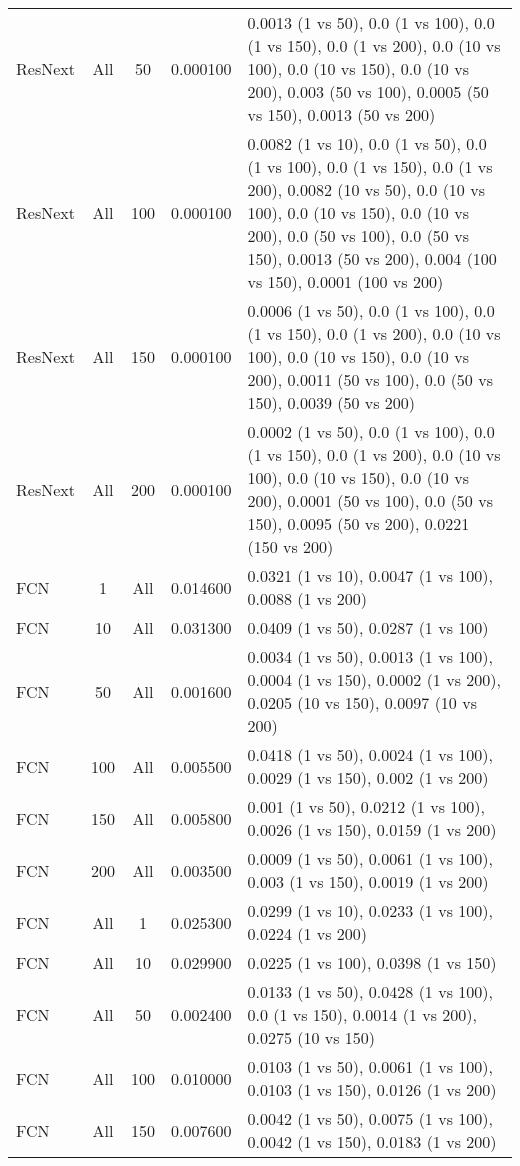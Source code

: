 \begin{tabular}{|l|c|c|c|p{7cm}|}
ResNext & All & 50 & 0.000100 & 0.0013 (1 vs 50), 0.0 (1 vs 100), 0.0 (1 vs 150), 0.0 (1 vs 200), 0.0 (10 vs 100), 0.0 (10 vs 150), 0.0 (10 vs 200), 0.003 (50 vs 100), 0.0005 (50 vs 150), 0.0013 (50 vs 200) \\
ResNext & All & 100 & 0.000100 & 0.0082 (1 vs 10), 0.0 (1 vs 50), 0.0 (1 vs 100), 0.0 (1 vs 150), 0.0 (1 vs 200), 0.0082 (10 vs 50), 0.0 (10 vs 100), 0.0 (10 vs 150), 0.0 (10 vs 200), 0.0 (50 vs 100), 0.0 (50 vs 150), 0.0013 (50 vs 200), 0.004 (100 vs 150), 0.0001 (100 vs 200) \\
ResNext & All & 150 & 0.000100 & 0.0006 (1 vs 50), 0.0 (1 vs 100), 0.0 (1 vs 150), 0.0 (1 vs 200), 0.0 (10 vs 100), 0.0 (10 vs 150), 0.0 (10 vs 200), 0.0011 (50 vs 100), 0.0 (50 vs 150), 0.0039 (50 vs 200) \\
ResNext & All & 200 & 0.000100 & 0.0002 (1 vs 50), 0.0 (1 vs 100), 0.0 (1 vs 150), 0.0 (1 vs 200), 0.0 (10 vs 100), 0.0 (10 vs 150), 0.0 (10 vs 200), 0.0001 (50 vs 100), 0.0 (50 vs 150), 0.0095 (50 vs 200), 0.0221 (150 vs 200) \\
FCN & 1 & All & 0.014600 & 0.0321 (1 vs 10), 0.0047 (1 vs 100), 0.0088 (1 vs 200) \\
FCN & 10 & All & 0.031300 & 0.0409 (1 vs 50), 0.0287 (1 vs 100) \\
FCN & 50 & All & 0.001600 & 0.0034 (1 vs 50), 0.0013 (1 vs 100), 0.0004 (1 vs 150), 0.0002 (1 vs 200), 0.0205 (10 vs 150), 0.0097 (10 vs 200) \\
FCN & 100 & All & 0.005500 & 0.0418 (1 vs 50), 0.0024 (1 vs 100), 0.0029 (1 vs 150), 0.002 (1 vs 200) \\
FCN & 150 & All & 0.005800 & 0.001 (1 vs 50), 0.0212 (1 vs 100), 0.0026 (1 vs 150), 0.0159 (1 vs 200) \\
FCN & 200 & All & 0.003500 & 0.0009 (1 vs 50), 0.0061 (1 vs 100), 0.003 (1 vs 150), 0.0019 (1 vs 200) \\
FCN & All & 1 & 0.025300 & 0.0299 (1 vs 10), 0.0233 (1 vs 100), 0.0224 (1 vs 200) \\
FCN & All & 10 & 0.029900 & 0.0225 (1 vs 100), 0.0398 (1 vs 150) \\
FCN & All & 50 & 0.002400 & 0.0133 (1 vs 50), 0.0428 (1 vs 100), 0.0 (1 vs 150), 0.0014 (1 vs 200), 0.0275 (10 vs 150) \\
FCN & All & 100 & 0.010000 & 0.0103 (1 vs 50), 0.0061 (1 vs 100), 0.0103 (1 vs 150), 0.0126 (1 vs 200) \\
FCN & All & 150 & 0.007600 & 0.0042 (1 vs 50), 0.0075 (1 vs 100), 0.0042 (1 vs 150), 0.0183 (1 vs 200) \\

\end{tabular}

